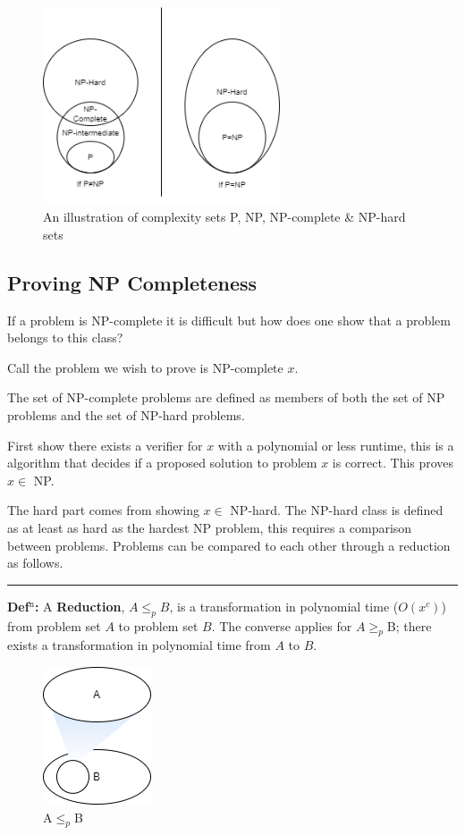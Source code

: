 \documentclass[a4paper,11pt]{report}
\begin{document}
\begin{figure}[h!]
	\begin{center}
		\includegraphics[width=70mm]{figures/np.drawio.png}
	\end{center}
	\caption{An illustration of complexity sets P, NP, NP-complete \& NP-hard sets\label{fig:npsets}}
\end{figure}

\subsection{Proving NP Completeness}

If a problem is NP-complete it is difficult but how does one show that a problem belongs to this class? 

Call the problem we wish to prove is NP-complete $x$.

The set of NP-complete problems are defined as members of both the set of NP problems and the set of NP-hard problems. 

First show there exists a verifier for $x$ with a polynomial or less runtime, this is a algorithm that decides if a proposed solution to problem $x$ is correct. This proves $x\in$ NP.

The hard part comes from showing $x\in$ NP-hard. The NP-hard class is defined as at least as hard as the hardest NP problem, this requires a comparison between problems. Problems can be compared to each other through a reduction as follows.

\noindent\rule{4cm}{0.4pt}

\textbf{Def$^\text{n}$:} A \textbf{Reduction}, $A \leq_p B$, is a transformation in polynomial time ($O(x^c)$) from problem set $A$ to problem set $B$. The converse applies for $A\geq_p$B; there exists a transformation in polynomial time from $A$ to $B$.

\begin{figure}[h!]
	\begin{center}
		\includegraphics{figures/reduction.png}
	\end{center}
	\caption{\label{fig:reduction}A$\leq_p$B}
\end{figure}
\end{document}
